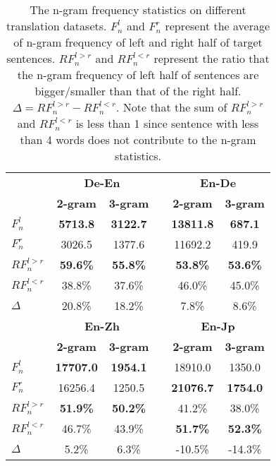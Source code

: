 \documentclass[11pt,a4paper]{article}
\begin{document}



\begin{table}[t]
\centering
\small
\begin{tabular}{l c c c c c}
\toprule
& \multicolumn{2}{c}{\textbf{De-En}} & & \multicolumn{2}{c}{\textbf{En-De}}   \\
\cmidrule{2-3}  \cmidrule{5-6}

&  \textbf{2-gram} &  \textbf{3-gram} & & \textbf{2-gram} & \textbf{3-gram} \\
\midrule
$F^{l}_{n}$ &  \textbf{5713.8} & \textbf{3122.7} & &  \textbf{13811.8} & \textbf{687.1} \\
$F^{r}_{n}$ &  3026.5 & 1377.6 & & 11692.2 & 419.9 \\
\midrule
$RF^{l>r}_{n}$  & \textbf{59.6\%} & \textbf{55.8\%} & &  \textbf{53.8\%} & \textbf{53.6\%} \\
$RF^{l<r}_{n}$  & 38.8\% & 37.6\% & & 46.0\% & 45.0\% \\
$\Delta$ & 20.8\% & 18.2\% &  &  7.8\% & 8.6\%  \\
\bottomrule
\bottomrule
& \multicolumn{2}{c}{\textbf{En-Zh}} & & \multicolumn{2}{c}{\textbf{En-Jp}} \\
\cmidrule{2-3}  \cmidrule{5-6}
&  \textbf{2-gram} &  \textbf{3-gram} &  & \textbf{2-gram} &  \textbf{3-gram}  \\
\midrule
$F^{l}_{n}$  & \textbf{17707.0} & \textbf{1954.1} &  & 18910.0 & 1350.0 \\
$F^{r}_{n}$  & 16256.4 & 1250.5 &  & \textbf{21076.7} & \textbf{1754.0} \\
\midrule
$RF^{l>r}_{n}$  & \textbf{51.9\%} & \textbf{50.2\%} &  & 41.2\% & 38.0\% \\
$RF^{l<r}_{n}$  & 46.7\% & 43.9\% &  & \textbf{51.7\%} & \textbf{52.3\%} \\
$\Delta$ & 5.2\% & 6.3\% &  &  -10.5\% & -14.3\%  \\
\bottomrule
\end{tabular}
\caption{The n-gram frequency statistics on different translation datasets. $F^{l}_{n}$ and $F^{r}_{n}$ represent the average of n-gram frequency of left and right half of target sentences. $RF^{l>r}_{n}$ and $RF^{l<r}_{n}$ represent the ratio that the n-gram frequency of left half of sentences are bigger/smaller than that of the right half. $\Delta=RF^{l>r}_{n}-RF^{l<r}_{n}$. Note that the sum of $RF^{l>r}_{n}$ and $RF^{l<r}_{n}$ is less than 1 since sentence with less than 4 words does not contribute to the n-gram statistics.}
\label{table_ngram_freq}
\end{table}
\end{document}
